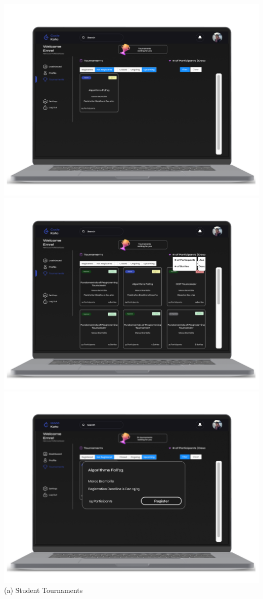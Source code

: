 \begin{center}
    \includegraphics[scale=0.13]{Images/ui-ux/student_tournaments/student_tournaments_2.png}    \includegraphics[scale=0.13]{Images/ui-ux/student_tournaments/student_tournaments_3.png}    \includegraphics[scale=0.13]{Images/ui-ux/student_tournaments/student_tournaments_4.png}
        (a) Student Tournaments
\end{center}

